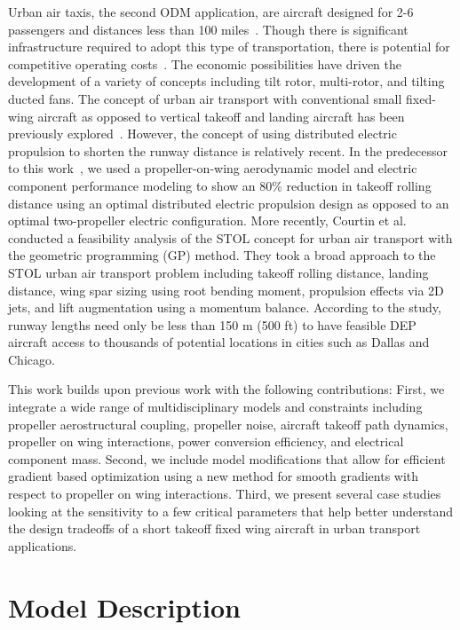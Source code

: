 \documentclass[conf]{new-aiaa}
\begin{document}
Urban air taxis, the second ODM application, are aircraft designed for 2-6 passengers and distances less than 100 miles~\cite{Holmes:2016aa}. Though there is significant infrastructure required to adopt this type of transportation, there is potential for competitive operating costs~\cite{Antcliff:2016aa}. The economic possibilities have driven the development of a variety of concepts including tilt rotor, multi-rotor, and tilting ducted fans. The concept of urban air transport with conventional small fixed-wing aircraft as opposed to vertical takeoff and landing aircraft has been previously explored~\cite{Holmes:2004aa}. However, the concept of using distributed electric propulsion to shorten the runway distance is relatively recent. In the predecessor to this work~\cite{Moore:2018aa}, we used a propeller-on-wing aerodynamic model and electric component performance modeling to show an 80\% reduction in takeoff rolling distance using an optimal distributed electric propulsion design as opposed to an optimal two-propeller electric configuration. More recently, Courtin et al.~\cite{Courtin:2018aa} conducted a feasibility analysis of the STOL concept for urban air transport with the geometric programming (GP) method. They took a broad approach to the STOL urban air transport problem including takeoff rolling distance, landing distance, wing spar sizing using root bending moment, propulsion effects via 2D jets, and lift augmentation using a momentum balance. According to the study, runway lengths need only be less than 150 m (500 ft) to have feasible DEP aircraft access to thousands of potential locations in cities such as Dallas and Chicago.

This work builds upon previous work with the following contributions: First, we integrate a wide range of multidisciplinary models and constraints including propeller aerostructural coupling, propeller noise, aircraft takeoff path dynamics, propeller on wing interactions, power conversion efficiency, and electrical component mass. Second, we include model modifications that allow for efficient gradient based optimization using a new method for smooth gradients with respect to propeller on wing interactions. Third, we present several case studies looking at the sensitivity to a few critical parameters that help better understand the design tradeoffs of a short takeoff fixed wing aircraft in urban transport applications.


\section{Model Description}
\end{document}
